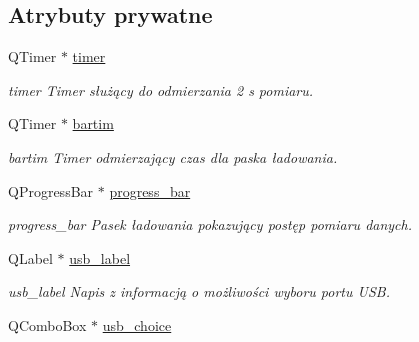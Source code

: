 \subsection*{Atrybuty prywatne}
\begin{DoxyCompactItemize}
\item 
\hypertarget{class_okno_a0ca5cf439ed8ad3ab7ef7b854c267f1b}{Q\-Timer $\ast$ \hyperlink{class_okno_a0ca5cf439ed8ad3ab7ef7b854c267f1b}{timer}}\label{class_okno_a0ca5cf439ed8ad3ab7ef7b854c267f1b}

\begin{DoxyCompactList}\small\item\em timer Timer służący do odmierzania 2 s pomiaru. \end{DoxyCompactList}\item 
\hypertarget{class_okno_a0c69b007d741152d74b5d3d498289a48}{Q\-Timer $\ast$ \hyperlink{class_okno_a0c69b007d741152d74b5d3d498289a48}{bartim}}\label{class_okno_a0c69b007d741152d74b5d3d498289a48}

\begin{DoxyCompactList}\small\item\em bartim Timer odmierzający czas dla paska ładowania. \end{DoxyCompactList}\item 
\hypertarget{class_okno_aebc2e861da784f50f7965b17cfd8a85e}{Q\-Progress\-Bar $\ast$ \hyperlink{class_okno_aebc2e861da784f50f7965b17cfd8a85e}{progress\-\_\-bar}}\label{class_okno_aebc2e861da784f50f7965b17cfd8a85e}

\begin{DoxyCompactList}\small\item\em progress\-\_\-bar Pasek ładowania pokazujący postęp pomiaru danych. \end{DoxyCompactList}\item 
\hypertarget{class_okno_a69cde4a1b1adcb98dd0f74b4a27a13e8}{Q\-Label $\ast$ \hyperlink{class_okno_a69cde4a1b1adcb98dd0f74b4a27a13e8}{usb\-\_\-label}}\label{class_okno_a69cde4a1b1adcb98dd0f74b4a27a13e8}

\begin{DoxyCompactList}\small\item\em usb\-\_\-label Napis z informacją o możliwości wyboru portu U\-S\-B. \end{DoxyCompactList}\item 
\hypertarget{class_okno_ae069d59c53771223e2c82d6d6ace45d3}{Q\-Combo\-Box $\ast$ \hyperlink{class_okno_ae069d59c53771223e2c82d6d6ace45d3}{usb\-\_\-choice}}\label{class_okno_ae069d59c53771223e2c82d6d6ace45d3}


\end{DoxyCompactItemize}
